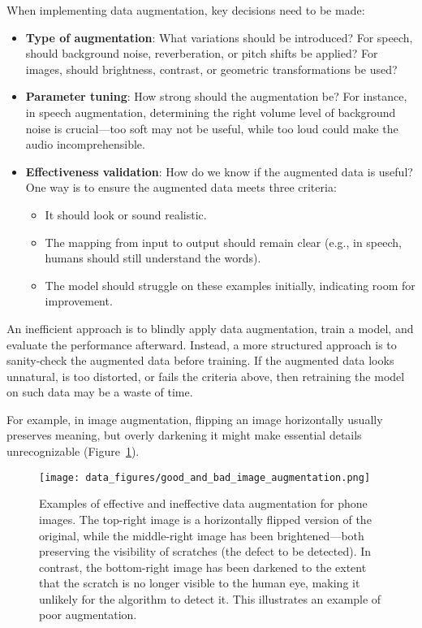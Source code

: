 \documentclass[12pt,openany]{book}
\begin{document}
When implementing data augmentation, key decisions need to be made:
\begin{itemize}
    \item \textbf{Type of augmentation}: What variations should be introduced? For speech, should background noise, reverberation, or pitch shifts be applied? For images, should brightness, contrast, or geometric transformations be used?
    \item \textbf{Parameter tuning}: How strong should the augmentation be? For instance, in speech augmentation, determining the right volume level of background noise is crucial—too soft may not be useful, while too loud could make the audio incomprehensible.
    \item \textbf{Effectiveness validation}: How do we know if the augmented data is useful? One way is to ensure the augmented data meets three criteria:
        \begin{itemize}
            \item It should look or sound realistic.
            \item The mapping from input to output should remain clear (e.g., in speech, humans should still understand the words).
            \item The model should struggle on these examples initially, indicating room for improvement.
        \end{itemize}
\end{itemize}

An inefficient approach is to blindly apply data augmentation, train a model, and evaluate the performance afterward. Instead, a more structured approach is to sanity-check the augmented data before training. If the augmented data looks unnatural, is too distorted, or fails the criteria above, then retraining the model on such data may be a waste of time. \newline

For example, in image augmentation, flipping an image horizontally usually preserves meaning, but overly darkening it might make essential details unrecognizable (Figure~\ref{fig:good_and_bad_image_augmentation}). 

\begin{figure}[H]
    \centering
    \texttt{[image: data\_figures/good\_and\_bad\_image\_augmentation.png]}
    \caption{Examples of effective and ineffective data augmentation for phone images. The top-right image is a horizontally flipped version of the original, while the middle-right image has been brightened—both preserving the visibility of scratches (the defect to be detected). In contrast, the bottom-right image has been darkened to the extent that the scratch is no longer visible to the human eye, making it unlikely for the algorithm to detect it. This illustrates an example of poor augmentation.}
    \label{fig:good_and_bad_image_augmentation}
\end{figure}
\end{document}
